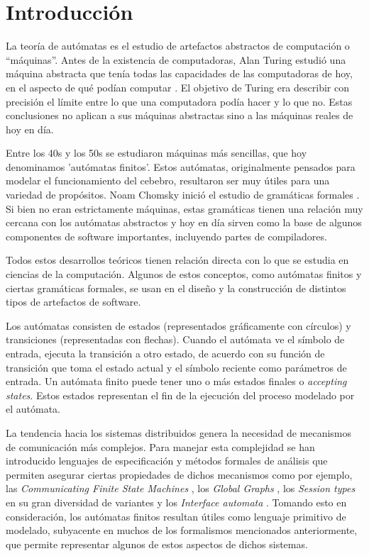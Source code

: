 \section{Introducción}
La teoría de autómatas es el estudio de artefactos abstractos de computación o ``máquinas''. Antes de la existencia de computadoras, Alan Turing estudió una máquina abstracta que tenía todas las capacidades de las computadoras de hoy, en el aspecto de qué podían computar \cite{turing:plms-s2-42_1,turing:plms-s2-43_1}. El objetivo de Turing era describir con precisión el límite entre lo que una computadora podía hacer y lo que no. Estas conclusiones no aplican a sus máquinas abstractas sino a las máquinas reales de hoy en día.

Entre los 40s y los 50s se estudiaron máquinas más sencillas, que hoy denominamos 'autómatas finitos'. Estos autómatas, originalmente pensados para modelar el funcionamiento del cebebro, resultaron ser muy útiles para una variedad de propósitos. Noam Chomsky inició el estudio de gramáticas formales \cite{chomsky:iretit-2_3}. Si bien no eran estrictamente máquinas, estas gramáticas tienen una relación muy cercana con los autómatas abstractos y hoy en día sirven como la base de algunos componentes de software importantes, incluyendo partes de compiladores.

Todos estos desarrollos teóricos tienen relación directa con lo que se estudia en ciencias de la computación. Algunos de estos conceptos, como autómatas finitos y ciertas gramáticas formales, se usan en el diseño y la construcción de distintos tipos de artefactos de software.

Los autómatas consisten de estados (representados gráficamente con círculos) y transiciones (representadas con flechas). Cuando el autómata ve el símbolo de entrada, ejecuta la transición a otro estado, de acuerdo con su función de transición que toma el estado actual y el símbolo reciente como parámetros de entrada. Un autómata finito puede tener uno o más estados finales o \emph{accepting states}. Estos estados representan el fin de la ejecución del proceso modelado por el autómata.

La tendencia hacia los sistemas distribuidos genera la necesidad de mecanismos de comunicación más complejos. Para manejar esta complejidad se han introducido lenguajes de especificación y métodos formales de análisis que permiten asegurar ciertas propiedades de dichos mecanismos como por ejemplo, las \emph{Communicating Finite State Machines} \cite{CFSM}, los \emph{Global Graphs} \cite{castagna:lmcs-8_1}, los \emph{Session types} en su gran diversidad de variantes \cite{honda:esop98,honda:popl08} y los \emph{Interface automata} \cite{dealfaro:esec-fse-01}. Tomando esto en consideración, los autómatas finitos resultan útiles como lenguaje primitivo de modelado, subyacente en muchos de los formalismos mencionados anteriormente, que permite representar algunos de estos aspectos de dichos sistemas.


